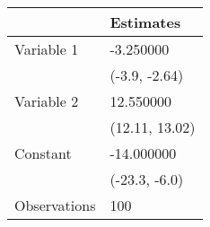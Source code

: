 \begin{tabular}{ll}
\toprule
 & Estimates \\
\midrule
Variable 1 & -3.250000 \\
  & (-3.9, -2.64) \\
Variable 2 & 12.550000 \\
  & (12.11, 13.02) \\
Constant & -14.000000 \\
  & (-23.3, -6.0) \\
Observations & 100 \\
\bottomrule
\end{tabular}
